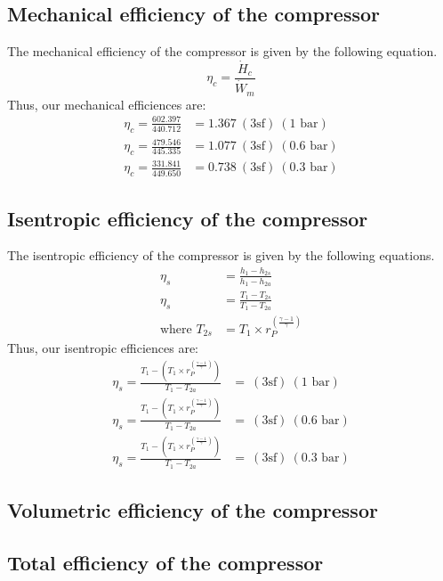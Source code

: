 \documentclass[class=article, crop=false, 12pt,a4paper]{standalone}
\numberwithin{equation}{section}
\begin{document}
\subsection{Mechanical efficiency of the compressor}
The mechanical efficiency of the compressor is given by the following equation.
\begin{equation}
  \eta_c = \frac{\dot{H}_c}{\dot{W}_m}
\end{equation}
Thus, our mechanical efficiences are:
\begin{align}
  \eta_c = \frac{602.397}{440.712} &= 1.367 \ (3\textrm{sf}) \ (1 \textrm{ bar})\\
  \eta_c = \frac{479.546}{445.335} &= 1.077 \ (3\textrm{sf}) \ (0.6 \textrm{ bar})\\
  \eta_c = \frac{331.841}{449.650} &= 0.738 \ (3\textrm{sf}) \ (0.3 \textrm{ bar})
\end{align}
\subsection{Isentropic efficiency of the compressor}
The isentropic efficiency of the compressor is given by the following equations.
\begin{align}
  \eta_s &= \frac{h_1 - h_{2s}}{h_1 - h_{2a}}\\
  \eta_s &= \frac{T_1 - T_{2s}}{T_1 - T_{2a}}\\
  \textrm{where } T_{2s} &= T_1 \times r_P^{\left(\frac{\gamma -1}{\gamma} \right)}
\end{align}
Thus, our isentropic efficiences are:
\begin{align}
  \eta_s = \frac{T_1 - \left( T_1 \times r_P^{\left(\frac{\gamma -1}{\gamma} \right)} \right)}{T_1 - T_{2a}} &=  \ (3\textrm{sf}) \ (1 \textrm{ bar})\\
  \eta_s = \frac{T_1 - \left( T_1 \times r_P^{\left(\frac{\gamma -1}{\gamma} \right)} \right)}{T_1 - T_{2a}} &= \ (3\textrm{sf}) \ (0.6 \textrm{ bar})\\
  \eta_s = \frac{T_1 - \left( T_1 \times r_P^{\left(\frac{\gamma -1}{\gamma} \right)} \right)}{T_1 - T_{2a}} &= \ (3\textrm{sf}) \ (0.3 \textrm{ bar})
\end{align}
\subsection{Volumetric efficiency of the compressor}
\subsection{Total efficiency of the compressor}
\end{document}
